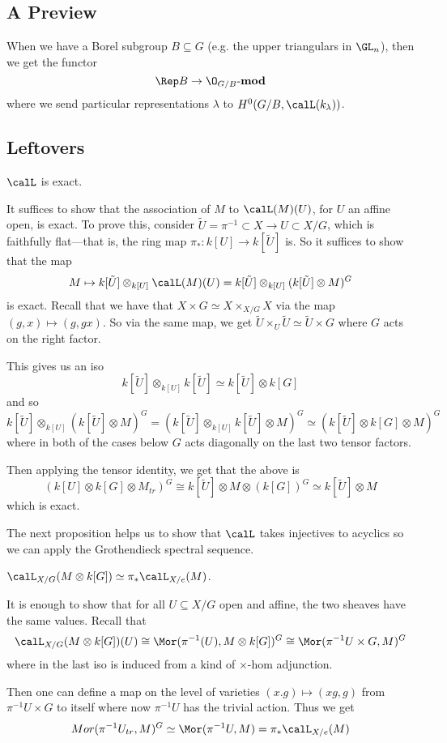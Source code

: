 \documentclass[12pt]{article}
\begin{document}
\subsection{A Preview}
When we have a Borel subgroup $B\subseteq G$ (e.g. the upper triangulars in $\GL_n$), 
then we get the functor 
\[\Rep B\to \O_{G/B}\text{-}\mathbf{mod}\]
where we send particular representations $\lambda$ to $H^0(G/B,\calL(k_\lambda))$.

\subsection{Leftovers}
\begin{prop}
	$\calL$ is exact.
\end{prop}
\begin{prf}
	It suffices to show that the association of $M$ to $\calL(M)(U)$, for $U$ an affine open, is exact. To 
	prove this, consider $\tilde U=\pi^{-1}\subset X\to U\subset X/G$, which is faithfully flat---that is, the ring map 
	$\pi_\ast:k[U]\to k[\tilde U]$ is. So it suffices to show that the map 
	\[M\mapsto k[\tilde U]\otimes_{k[U]}\calL(M)(U)=k[\tilde U]\otimes_{k[U]}(k[\tilde U]\otimes M)^G\]
	is exact. Recall that we have that $X\times G\simeq X\times_{X/G} X$ via the map $(g,x)\mapsto (g,gx).$
	So via the same map, we get $\tilde U\times_U\tilde U\simeq \tilde U\times G$ where $G$ acts on the right factor.

	This gives us an iso 
	\[k[\tilde U]\otimes_{k[U]}k[\tilde U]\simeq k[\tilde U]\otimes k[G]\]
	and so 
	\[k[\tilde U]\otimes_{k[U]}(k[\tilde U]\otimes M)^G=(k[\tilde U]\otimes_{k[U]}k[\tilde U]\otimes M)^G\simeq (k[\tilde U]\otimes k[G]\otimes M)^G\]
	where in both of the cases below $G$ acts diagonally on the last two tensor factors.

	Then applying the tensor identity, we get that the above is
	\[(k[U]\otimes k[G]\otimes M_{tr})^G\cong k[\tilde U]\otimes M\otimes (k[G])^G\simeq k[\tilde U]\otimes M\]
	which is exact. 
\end{prf}
The next proposition helps us to show that $\calL$ takes injectives to acyclics so we can apply the Grothendieck spectral sequence.
\begin{prop}
	$\calL_{X/G}(M\otimes k[G])\simeq \pi_\ast \calL_{X/e}(M)$.
\end{prop}
\begin{prf}
	It is enough to show that for all $U\subseteq X/G$ open and affine, the two sheaves have the same values. Recall that 
	\[\calL_{X/G}(M\otimes k[G])(U)\cong\Mor(\pi^{-1}(U),M\otimes k[G])^G\cong\Mor(\pi^{-1}U\times G,M)^G\]
	where in the last iso is induced from a kind of $\times$-hom adjunction.

	Then one can define a map on the level of varieties $(x.g)\mapsto (xg,g)$ from $\pi^{-1}U\times G$ to itself where 
	now $\pi^{-1}U$ has the trivial action.  Thus we get 
	\[Mor(\pi^{-1}U_{tr},M)^G\simeq\Mor(\pi^{-1}U,M)=\pi_\ast\calL_{X/e}(M)\]
\end{prf}
\end{document}
